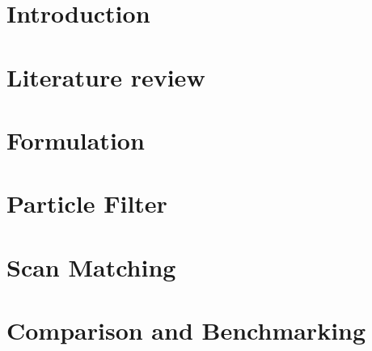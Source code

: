 \documentclass[harvard]{lincolncsuthesis}
\begin{document}
\maketitle

%




%

\thesisTables

\thesisBodyStart

\chapter{Introduction}
\label{chap:Introduction}


\chapter{Literature review}
\label{chap:Literature}


\chapter{Formulation}
\label{chap:Formulation}


\chapter{Particle Filter}
\label{chap:Particle}


\chapter{Scan Matching}
\label{chap:Scan}


\chapter{Comparison and Benchmarking}
\label{chap:Comparison}

\end{document}
